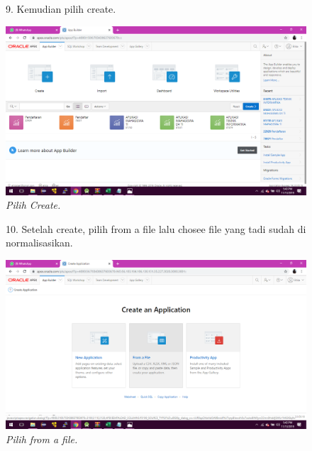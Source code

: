 \begin{enumerate}
\begin{figure}
\item[9.]Kemudian pilih create.   
    \begin{center}
    \includegraphics[scale=0.3]{figures/4.png}
    \caption{\textit{Pilih Create.}}
    \end{center}
    \label{gambar}
    \end{figure}

\begin{figure}
\item[10.]Setelah create, pilih from a file lalu chosee file yang tadi sudah di normalisasikan.
    \begin{center}
    \includegraphics[scale=0.3]{figures/5.png}
    \caption{\textit{Pilih from a file.}}
     \end{center}
    \label{gambar}
    \end{figure}
 

\end{enumerate}
